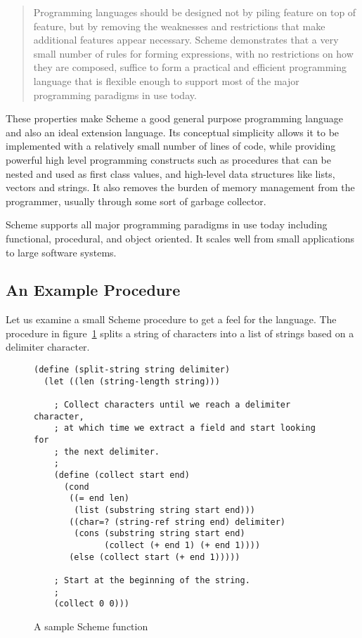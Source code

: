 \begin{quotation}
  Programming languages should be designed not by piling feature on
  top of feature, but by removing the weaknesses and restrictions that
  make additional features appear necessary.  Scheme demonstrates that
  a very small number of rules for forming expressions, with no
  restrictions on how they are composed, suffice to form a practical
  and efficient programming language that is flexible enough to
  support most of the major programming paradigms in use
  today.~\cite{bib:scheme} 
\end{quotation}

These properties make Scheme a good general purpose programming
language and also an ideal extension language.  Its conceptual
simplicity allows it to be implemented with a relatively small number
of lines of code, while providing powerful high level programming
constructs such as procedures that can be nested and used as first
class values, and high-level data structures like lists, vectors and
strings.  It also removes the burden of memory management from the
programmer, usually through some sort of garbage collector.  

Scheme supports all major programming paradigms in use today including
functional, procedural, and object oriented.  It scales well from
small applications to large software systems.

\subsection{An Example Procedure}

Let us examine a small Scheme procedure to get a feel for the
language.  The procedure in figure~\ref{fig:split} splits a string of
characters into a list of strings based on a delimiter character.

\begin{figure}[htbp]
\begin{center}
\begin{verbatim}
(define (split-string string delimiter)
  (let ((len (string-length string)))

    ; Collect characters until we reach a delimiter character, 
    ; at which time we extract a field and start looking for
    ; the next delimiter.
    ;
    (define (collect start end)
      (cond
       ((= end len)
        (list (substring string start end)))
       ((char=? (string-ref string end) delimiter)
        (cons (substring string start end)
              (collect (+ end 1) (+ end 1))))
       (else (collect start (+ end 1)))))

    ; Start at the beginning of the string.
    ;
    (collect 0 0)))

\end{verbatim}
\end{center}  
  \caption{A sample Scheme function}
  \label{fig:split}
\end{figure}

